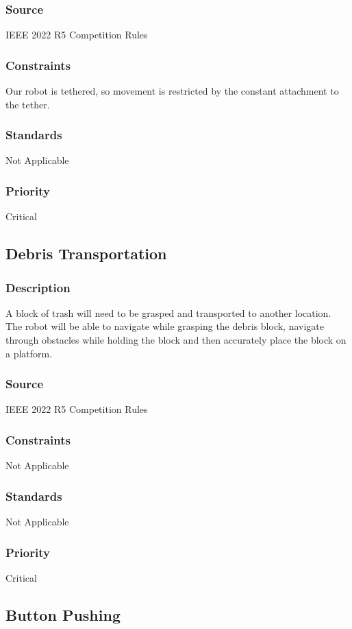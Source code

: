 \subsubsection{Source}
IEEE 2022 R5 Competition Rules
\subsubsection{Constraints}
Our robot is tethered, so movement is restricted by the constant attachment to the tether.
\subsubsection{Standards}
Not Applicable
\subsubsection{Priority}
Critical

\subsection{Debris Transportation}
\subsubsection{Description}
A block of trash will need to be grasped and transported to another location. The robot will be able to navigate while grasping the debris block, navigate through obstacles while holding the block and then accurately place the block on a platform.
\subsubsection{Source}
IEEE 2022 R5 Competition Rules
\subsubsection{Constraints}
Not Applicable
\subsubsection{Standards}
Not Applicable
\subsubsection{Priority}
Critical

\subsection{Button Pushing}
